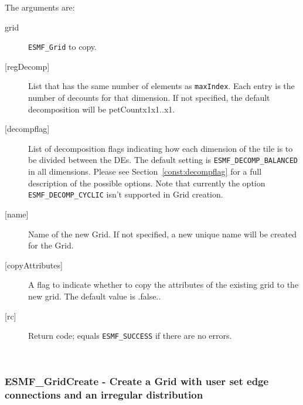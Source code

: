    The arguments are:
   \begin{description}
   \item[grid]
       {\tt ESMF\_Grid} to copy.
   \item[{[regDecomp]}]
        List that has the same number of elements as {\tt maxIndex}.
        Each entry is the number of decounts for that dimension.
        If not specified, the default decomposition will be petCountx1x1..x1.
   \item[{[decompflag]}]
        List of decomposition flags indicating how each dimension of the
        tile is to be divided between the DEs. The default setting
        is {\tt ESMF\_DECOMP\_BALANCED} in all dimensions. Please see
        Section~\ref{const:decompflag} for a full description of the
        possible options. Note that currently the option
        {\tt ESMF\_DECOMP\_CYCLIC} isn't supported in Grid creation.
   \item[{[name]}]
        Name of the new Grid. If not specified, a new unique name will be
        created for the Grid.
   \item[{[copyAttributes]}]
        A flag to indicate whether to copy the attributes of the existing grid
        to the new grid.  The default value is .false..
   \item[{[rc]}]
        Return code; equals {\tt ESMF\_SUCCESS} if there are no errors.
   \end{description}
   
 
\mbox{}\hrulefill\ 
 
\subsubsection [ESMF\_GridCreate] {ESMF\_GridCreate - Create a Grid with user set edge connections and an irregular distribution}


